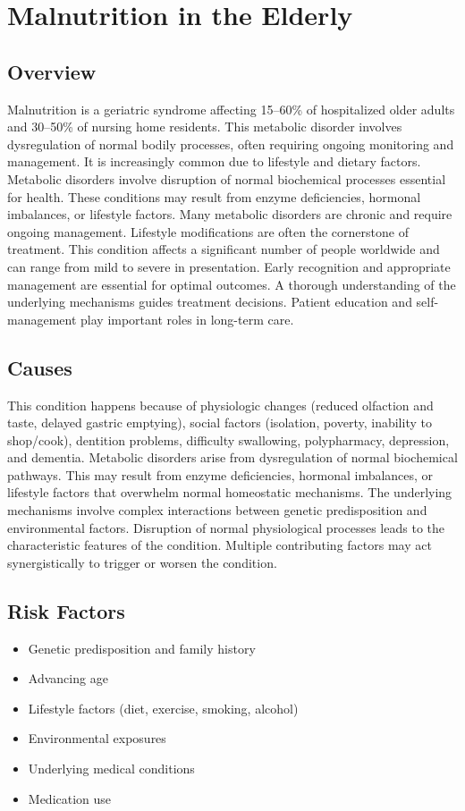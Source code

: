 \chapter{Malnutrition in the Elderly}
\label{sec:Malnutrition in the Elderly}

\section{Overview}
Malnutrition is a geriatric syndrome affecting 15--60\% of hospitalized older adults and 30--50\% of nursing home residents. This metabolic disorder involves dysregulation of normal bodily processes, often requiring ongoing monitoring and management. It is increasingly common due to lifestyle and dietary factors. Metabolic disorders involve disruption of normal biochemical processes essential for health. These conditions may result from enzyme deficiencies, hormonal imbalances, or lifestyle factors. Many metabolic disorders are chronic and require ongoing management. Lifestyle modifications are often the cornerstone of treatment. This condition affects a significant number of people worldwide and can range from mild to severe in presentation. Early recognition and appropriate management are essential for optimal outcomes. A thorough understanding of the underlying mechanisms guides treatment decisions. Patient education and self-management play important roles in long-term care.
\section{Causes}
This condition happens because of physiologic changes (reduced olfaction and taste, delayed gastric emptying), social factors (isolation, poverty, inability to shop/cook), dentition problems, difficulty swallowing, polypharmacy, depression, and dementia. Metabolic disorders arise from dysregulation of normal biochemical pathways. This may result from enzyme deficiencies, hormonal imbalances, or lifestyle factors that overwhelm normal homeostatic mechanisms. The underlying mechanisms involve complex interactions between genetic predisposition and environmental factors. Disruption of normal physiological processes leads to the characteristic features of the condition. Multiple contributing factors may act synergistically to trigger or worsen the condition.
\section{Risk Factors}
\begin{itemize}[noitemsep]
  \item Genetic predisposition and family history
  \item Advancing age
  \item Lifestyle factors (diet, exercise, smoking, alcohol)
  \item Environmental exposures
  \item Underlying medical conditions
  \item Medication use
\end{itemize}
